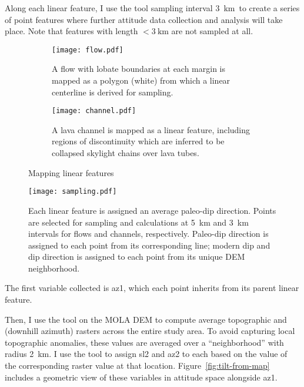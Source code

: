 \newcommand{\samplinginterval}{\qty{3}{\km}}

Along each linear feature, I use the  tool sampling interval \samplinginterval\ to create a series of point features where further attitude data collection and analysis will take place. Note that features with length $<\samplinginterval$ are not sampled at all.

\begin{figure}
    \centering
    \begin{subfigure}{\textwidth}
        \centering
        \texttt{[image: flow.pdf]}
        \caption[Mapped lava flow \& centerline]{A flow with lobate boundaries at each margin is mapped as a polygon (white) from which a linear centerline is derived for sampling.}%
        \label{fig:flow}
    \end{subfigure}
    \begin{subfigure}{\textwidth}
        \centering
        \texttt{[image: channel.pdf]}
        \caption[Mapped lava channel]{A lava channel is mapped as a linear feature, including regions of discontinuity which are inferred to be collapsed skylight chains over lava tubes.}%
        \label{fig:channel}
    \end{subfigure}
    \caption{Mapping linear features}%
    \label{fig:mapping-linear}
\end{figure}

\begin{figure}
    \centering
    \texttt{[image: sampling.pdf]}
    \caption[Sampling site selection]{Each linear feature is assigned an average paleo-dip direction. Points are selected for sampling and calculations at \qty{5}{\km} and \qty{3}{\km} intervals for flows and channels, respectively. Paleo-dip direction is assigned to each point from its corresponding line; modern dip and dip direction is assigned to each point from its unique \ac{DEM} neighborhood.}%
    \label{fig:sampling}
\end{figure}

\newcommand{\neighborhood}{\qty{2}{\km}}

The first variable collected is \ac{az1}, which each point inherits from its parent linear feature.

Then, I use the  tool on the \ac{MOLA} \ac{DEM} to compute average topographic  and  (downhill azimuth) rasters across the entire study area. To avoid capturing local topographic anomalies, these values are averaged over a ``neighborhood'' with radius \neighborhood. I use the  tool to assign \ac{sl2} and \ac{az2} to each based on the value of the corresponding raster value at that location. Figure~\ref{fig:tilt-from-map} includes a geometric view of these variables in attitude space alongside \acs{az1}.

